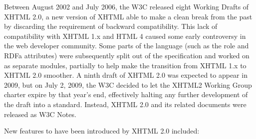 Between August 2002 and July 2006, the W3C released eight Working Drafts of XHTML 2.0, a new version of XHTML able to make a clean break from the past by discarding the requirement of backward compatibility. This lack of compatibility with XHTML 1.x and HTML 4 caused some early controversy in the web developer community. Some parts of the language (such as the role and RDFa attributes) were subsequently split out of the specification and worked on as separate modules, partially to help make the transition from XHTML 1.x to XHTML 2.0 smoother. A ninth draft of XHTML 2.0 was expected to appear in 2009, but on July 2, 2009, the W3C decided to let the XHTML2 Working Group charter expire by that year's end, effectively halting any further development of the draft into a standard. Instead, XHTML 2.0 and its related documents were released as W3C Notes.

New features to have been introduced by XHTML 2.0 included:

